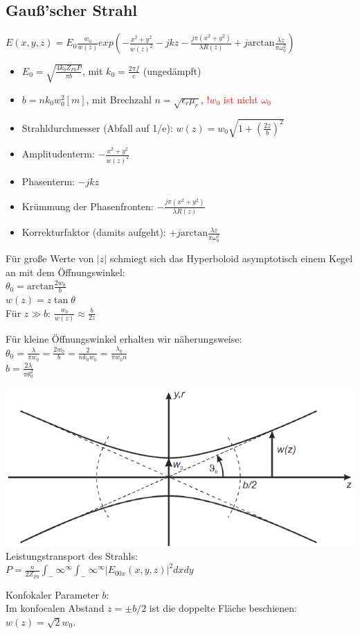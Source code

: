 \documentclass[english]{latex4ei/latex4ei_sheet}
\newcommand{\danger}[1]{\textcolor{red}{#1}}
\begin{document}
\begin{sectionbox}
	\subsection{Gauß'scher Strahl}
	\begin{emphbox}
		$E(x,y,z) = E_0\frac{w_0}{w(z)}exp\left(-\frac{x^2+y^2}{w(z)^2} -jkz - \frac{j\pi (x^2+y^2)}{\lambda R(z)} +j\text{arctan}\frac{\lambda z}{\pi \omega_0^2}\right)$
	\end{emphbox}
	\begin{itemize}
		\item $E_0 = \sqrt{\frac{4 k_{0} Z_{F 0} P}{\pi b}}$, mit $k_0 = \frac{2\pi f}{c}$ (ungedämpft)
		\item $b = n k_0 w_0^2[m]$, mit Brechzahl $n = \sqrt{\epsilon_r \mu_r}$, \danger{!$w_0$ ist nicht $\omega_0$}
		\item Strahldurchmesser (Abfall auf 1/e): $w(z) = w_0 \sqrt{1 + \left(\frac{2z}{b}\right)^2}$
		\item Amplitudenterm: $-\frac{x^2+y^2}{w(z)^2}$
		\item Phasenterm: $-jkz$
		\item Krümmung der Phasenfronten: $- \frac{j\pi (x^2+y^2)}{\lambda R(z)}$
		\item Korrekturfaktor (damits aufgeht): $+j\text{arctan}\frac{\lambda z}{\pi \omega_0^2}$
	\end{itemize}
	Für große Werte von $|z|$ schmiegt sich das Hyperboloid asymptotisch einem Kegel an mit dem Öffnungswinkel:\\
	$\theta_0 = \text{arctan}\frac{2w_0}{b}$\\
	$w(z) = z\tan\theta$\\
	Für $z \gg b$: $\frac{w_0}{w(z)} \approx \frac{b}{2z}$
	
	Für kleine Öffnungswinkel erhalten wir näherungsweise:\\
	$\theta_0 = \frac{\lambda}{\pi w_0} = \frac{2w_0}{b} = \frac{2}{nk_0w_0} = \frac{\lambda_0}{\pi w_0 n}$\\
	$b=\frac{2 \lambda}{\pi \theta_{0}^{2}}$

	\includegraphics[width = \columnwidth]{./img/gauss_strahl.png}\\
	
	Leistungstransport des Strahls:\\
	$P = \frac{n}{2Z_{F0}}\int_-\infty^\infty\int_-\infty^\infty |E_{00x}(x,y,z)|^2 dxdy$

	Konfokaler Parameter $b$:\\
	Im konfocalen Abstand $z=\pm b/2$ ist die doppelte Fläche beschienen: $w(z) = \sqrt{2}w_0$.
\end{sectionbox}
\end{document}
